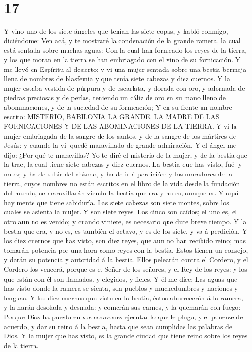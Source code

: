 \hypertarget{section-16}{%
\section{17}\label{section-16}}

 Y vino uno de los siete ángeles que tenían las siete copas,
y habló conmigo, diciéndome: Ven acá, y te mostraré la condenación de la
grande ramera, la cual está sentada sobre muchas aguas:  Con
la cual han fornicado los reyes de la tierra, y los que moran en la
tierra se han embriagado con el vino de su fornicación.  Y
me llevó en Espíritu al desierto; y vi una mujer sentada sobre una
bestia bermeja llena de nombres de blasfemia y que tenía siete cabezas y
diez cuernos.  Y la mujer estaba vestida de púrpura y de
escarlata, y dorada con oro, y adornada de piedras preciosas y de
perlas, teniendo un cáliz de oro en su mano lleno de abominaciones, y de
la suciedad de su fornicación;  Y en su frente un nombre
escrito: MISTERIO, BABILONIA LA GRANDE, LA MADRE DE LAS FORNICACIONES Y
DE LAS ABOMINACIONES DE LA TIERRA.  Y vi la mujer embriagada
de la sangre de los santos, y de la sangre de los mártires de Jesús: y
cuando la vi, quedé maravillado de grande admiración.  Y el
ángel me dijo: ¿Por qué te maravillas? Yo te diré el misterio de la
mujer, y de la bestia que la trae, la cual tiene siete cabezas y diez
cuernos.  La bestia que has visto, fué, y no es; y ha de
subir del abismo, y ha de ir á perdición: y los moradores de la tierra,
cuyos nombres no están escritos en el libro de la vida desde la
fundación del mundo, se maravillarán viendo la bestia que era y no es,
aunque es.  Y aquí hay mente que tiene sabiduría. Las siete
cabezas son siete montes, sobre los cuales se asienta la mujer.
 Y son siete reyes. Los cinco son caídos; el uno es, el
otro aun no es venido; y cuando viniere, es necesario que dure breve
tiempo.  Y la bestia que era, y no es, es también el
octavo, y es de los siete, y va á perdición.  Y los diez
cuernos que has visto, son diez reyes, que aun no han recibido reino;
mas tomarán potencia por una hora como reyes con la bestia.
 Estos tienen un consejo, y darán su potencia y autoridad á
la bestia.  Ellos pelearán contra el Cordero, y el Cordero
los vencerá, porque es el Señor de los señores, y el Rey de los reyes: y
los que están con él son llamados, y elegidos, y fieles.  Y
él me dice: Las aguas que has visto donde la ramera se sienta, son
pueblos y muchedumbres y naciones y lenguas.  Y los diez
cuernos que viste en la bestia, éstos aborrecerán á la ramera, y la
harán desolada y desnuda: y comerán sus carnes, y la quemarán con fuego:
 Porque Dios ha puesto en sus corazones ejecutar lo que le
plugo, y el ponerse de acuerdo, y dar su reino á la bestia, hasta que
sean cumplidas las palabras de Dios.  Y la mujer que has
visto, es la grande ciudad que tiene reino sobre los reyes de la tierra.

